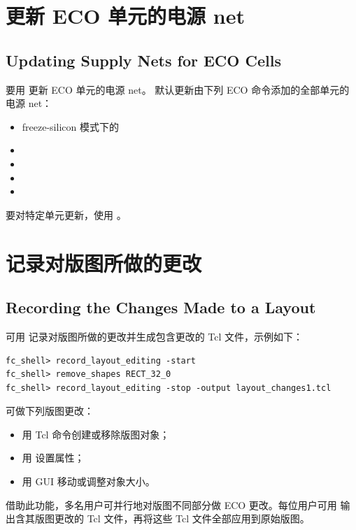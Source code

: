 \section{更新 ECO 单元的电源 net}
\subsection*{Updating Supply Nets for ECO Cells}

要用  更新 ECO 单元的电源 net。
默认更新由下列 ECO 命令添加的全部单元的电源 net：
\begin{itemize}
  \item freeze-silicon 模式下的 
  \item {}
  \item {}
  \item {}
  \item {}
\end{itemize}
要对特定单元更新，使用  。

\section{记录对版图所做的更改}
\subsection*{Recording the Changes Made to a Layout}

可用  记录对版图所做的更改并生成包含更改的 Tcl 文件，示例如下：
\begin{lstlisting}
fc_shell> record_layout_editing -start
fc_shell> remove_shapes RECT_32_0
fc_shell> record_layout_editing -stop -output layout_changes1.tcl
\end{lstlisting}

可做下列版图更改：
\begin{itemize}
  \item 用 Tcl 命令创建或移除版图对象；
  \item 用  设置属性；
  \item 用 GUI 移动或调整对象大小。
\end{itemize}

借助此功能，多名用户可并行地对版图不同部分做 ECO 更改。每位用户可用  输出含其版图更改的 Tcl 文件，再将这些 Tcl 文件全部应用到原始版图。

